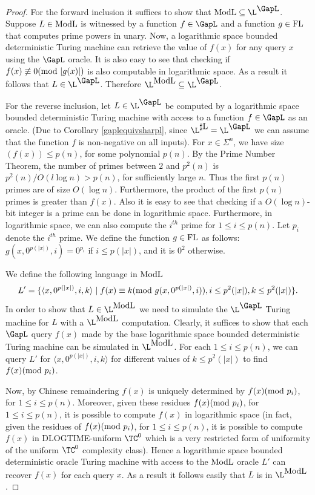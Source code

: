 \documentclass{amsbook}
\theoremstyle{definition}
\theoremstyle{remark}
\numberwithin{section}{chapter}
\numberwithin{equation}{chapter}
\newcommand{\TCzero}{\ensuremath{\TC^0}}
\newcommand{\sharpL}{\mbox{$\sharp$\rm L}}
\newcommand{\ModL}{\mbox{\rm ModL}}
\newcommand{\FL}{\mbox{\rm FL}}
\newcommand{\LModL}{\mbox{\ensuremath{\L ^{\ModL}}}}
\newcommand{\LGapL}{\mbox{\ensuremath{\L ^{\mbox{\GapL}}}}}
\newcommand{\LsharpL}{\mbox{\ensuremath{\L ^{\mbox{\sharpL}}}}}
\renewcommand{\mod}{\mbox{\textrm mod~}}
\begin{document}
\begin{proof}
For the forward inclusion it suffices to show that $\ModL\subseteq\LGapL$. Suppose $L\in\ModL$ is witnessed by a function $f\in\GapL$ and a function $g\in\FL$ that computes prime powers in unary. Now, a logarithmic space bounded deterministic Turing machine can retrieve the value of $f(x)$ for any query $x$ using the $\GapL$ oracle. It is also easy to see that checking if $f(x)\not\equiv 0(\mod |g(x)|)$ is also computable in logarithmic space. As a result it follows that $L\in\LGapL$. Therefore $\LModL\subseteq\LGapL$.

For the reverse inclusion, let $L\in\LGapL$ be computed by a logarithmic space bounded deterministic Turing machine with access to a function $f\in\GapL$ as an oracle. (Due to Corollary \ref{gaplequivsharpl}, since $\LsharpL=\LGapL$ we can assume that the function $f$ is non-negative on all inputs). For $x\in\Sigma^n$, we have size$(f(x))\leq p(n)$, for some polynomial $p(n)$. By the Prime Number Theorem, the number of primes between $2$ and $p^2(n)$ is $p^2(n)/O(l\log n)>p(n)$, for sufficiently large $n$. Thus the first $p(n)$ primes are of size $O(\log n)$. Furthermore, the product of the first $p(n)$ primes is greater than $f(x)$. Also it is easy to see that checking if a $O(\log n)$-bit integer is a prime can be done in logarithmic space. Furthermore, in logarithmic space, we can also compute the $i^{th}$ prime for $1\leq i\leq p(n)$. Let $p_i$ denote the $i^{th}$ prime. We define the function $g\in\FL$ as follows: $g(x,0^{p(|x|)},i)=0^{p_i}$ if $i\leq p(|x|)$, and it is $0^2$ otherwise.

We define the following language in $\ModL$
\[
L'=\{\langle x,0^{p(|x|)},i,k\rangle\mid f(x)\equiv k(\mod g(x,0^{p(|x|)},i)),i\leq p^2(|x|),k\leq p^2(|x|)\}.
\]
In order to show that $L\in\LModL$ we need to simulate the $\LGapL$ Turing machine for $L$ with a $\LModL$ computation. Clearly, it suffices to show that each $\GapL$ query $f(x)$ made by the base logarithmic space bounded deterministic Turing machine can be simulated in $\LModL$. For each $1\leq i\leq p(n)$, we can query $L'$ for $\langle x,0^{p(|x|)},i,k\rangle$ for different values of $k\leq p^2(|x|)$ to find $f(x)(\mod p_i)$.

Now, by Chinese remaindering $f(x)$ is uniquely determined by $f(x)(\mod p_i)$, for $1\leq i\leq p(n)$. Moreover, given these residues $f(x)(\mod p_i)$, for $1\leq i\leq p(n)$, it is possible to compute $f(x)$ in logarithmic space (in fact, given the residues of $f(x)(\mod p_i)$, for $1\leq i\leq p(n)$, it is possible to compute $f(x)$ in DLOGTIME-uniform $\TCzero$ which is a very restricted form of uniformity of the uniform $\TCzero$ complexity class). Hence a logarithmic space bounded deterministic oracle Turing machine with access to the $\ModL$ oracle $L'$ can recover $f(x)$ for each query $x$. As a result it follows easily that $L$ is in $\LModL$.
\end{proof}
\end{document}
